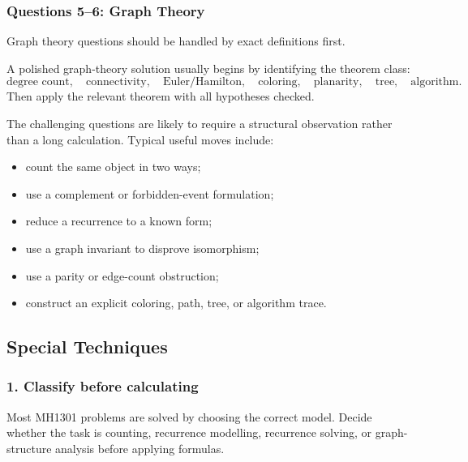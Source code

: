 \subsubsection{Questions 5--6: Graph Theory}

Graph theory questions should be handled by exact definitions first.

\begin{examtip}[title={Graph-theory solution template}]
A polished graph-theory solution usually begins by identifying the theorem class:
\[
\text{degree count},
\quad
\text{connectivity},
\quad
\text{Euler/Hamilton},
\quad
\text{coloring},
\quad
\text{planarity},
\quad
\text{tree},
\quad
\text{algorithm}.
\]
Then apply the relevant theorem with all hypotheses checked.
\end{examtip}

\begin{extension}[title={How to handle challenging questions}]
The challenging questions are likely to require a structural observation rather than a long calculation. Typical useful moves include:
\begin{itemize}[leftmargin=*]
    \item count the same object in two ways;
    \item use a complement or forbidden-event formulation;
    \item reduce a recurrence to a known form;
    \item use a graph invariant to disprove isomorphism;
    \item use a parity or edge-count obstruction;
    \item construct an explicit coloring, path, tree, or algorithm trace.
\end{itemize}
\end{extension}

\subsection{Special Techniques}

\subsubsection*{1. Classify before calculating}
Most MH1301 problems are solved by choosing the correct model. Decide whether the task is counting, recurrence modelling, recurrence solving, or graph-structure analysis before applying formulas.

